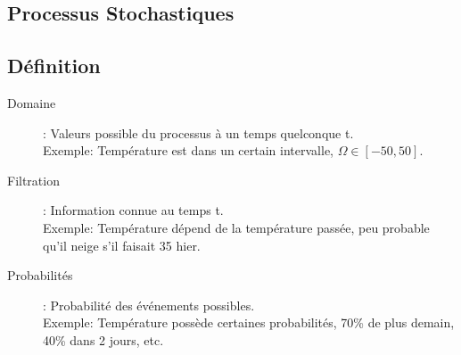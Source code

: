 \documentclass[10pt, french]{article}
\begin{document}
\begin{multicols*}{2}
%

\vfill\null

\section{Processus Stochastiques}

\subsection*{Définition}
\begin{description}
	\item[Domaine]: Valeurs possible du processus à un temps quelconque t. \\
	Exemple: Température est dans un certain intervalle, $\Omega \in [-50, 50]$.
	\item[Filtration]: Information connue au temps t.\\
	Exemple: Température dépend de la température passée, peu probable qu'il neige s'il faisait 35 hier.
	\item[Probabilités]: Probabilité des événements possibles.\\
	Exemple: Température possède certaines probabilités, 70\% de plus demain, 40\% dans 2 jours, etc.
\end{description}


\end{multicols*}
\end{document}
